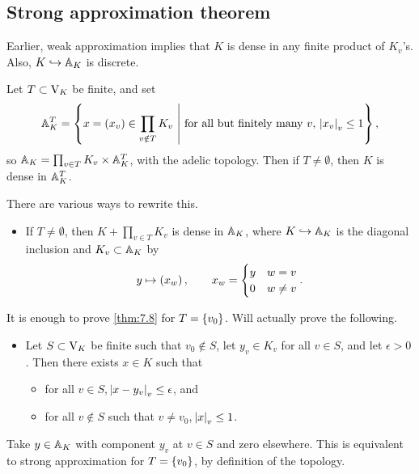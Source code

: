 \pagebreak

\subsection{Strong approximation theorem}

Earlier, weak approximation implies that $ K $ is dense in any finite product of $ K_v $'s. Also, $ K \hookrightarrow \AA_K $ is discrete.

\begin{theorem}
\label{thm:7.8}
Let $ T \subset \V_K $ be finite, and set
$$ \AA_K^T = \cbr{x = \br{x_v} \in \prod_{v \notin T} K_v \st \text{for all but finitely many} \ v, \ \abs{x_v}_v \le 1}, $$
so $ \AA_K = \prod_{v \in T} K_v \times \AA_K^T $, with the adelic topology. Then if $ T \ne \emptyset $, then $ K $ is dense in $ \AA_K^T $.
\end{theorem}

There are various ways to rewrite this.
\begin{itemize}
\item If $ T \ne \emptyset $, then $ K + \prod_{v \in T} K_v $ is dense in $ \AA_K $, where $ K \hookrightarrow \AA_K $ is the diagonal inclusion and $ K_v \subset \AA_K $ by
$$ y \mapsto \br{x_w}, \qquad x_w =
\begin{cases}
y & w = v \\
0 & w \ne v
\end{cases}.
$$
\end{itemize}
It is enough to prove \ref{thm:7.8} for $ T = \cbr{v_0} $. Will actually prove the following.
\begin{itemize}
\item Let $ S \subset \V_K $ be finite such that $ v_0 \notin S $, let $ y_v \in K_v $ for all $ v \in S $, and let $ \epsilon > 0 $. Then there exists $ x \in K $ such that
\begin{itemize}
\item for all $ v \in S $, $ \abs{x - y_v}_v \le \epsilon $, and
\item for all $ v \notin S $ such that $ v \ne v_0 $, $ \abs{x}_v \le 1 $.
\end{itemize}
\end{itemize}
Take $ y \in \AA_K $ with component $ y_v $ at $ v \in S $ and zero elsewhere. This is equivalent to strong approximation for $ T = \cbr{v_0} $, by definition of the topology.

